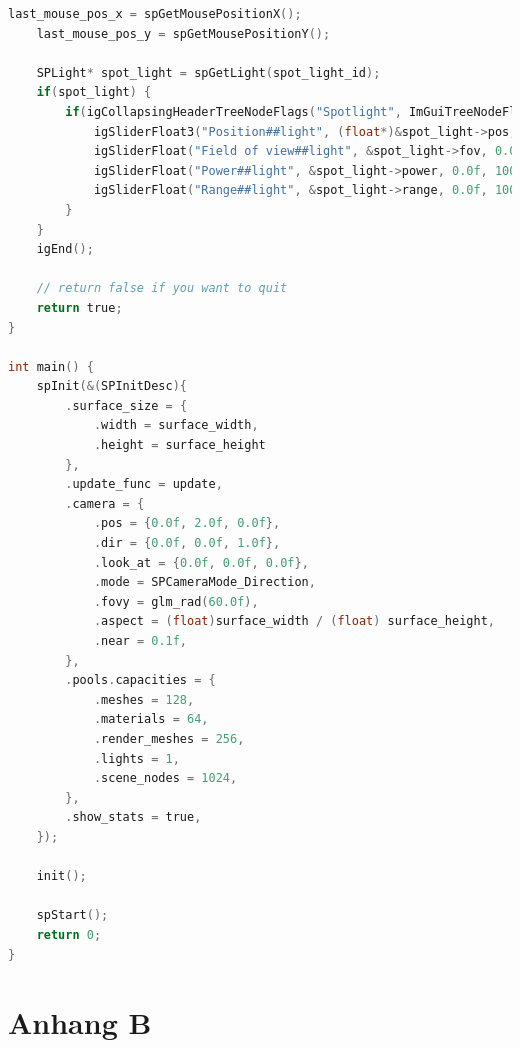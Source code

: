 \documentclass[oneside]{ausarbeitung}
\begin{document}
\begin{lstlisting}[language=C, label={lst:full_example}, caption={Kompletter C99-Quellcode zur Erstellung einer interaktiven 3D-Szene mit der \textbf{spider}-Engine}]
    last_mouse_pos_x = spGetMousePositionX();
    last_mouse_pos_y = spGetMousePositionY();
    
    SPLight* spot_light = spGetLight(spot_light_id);
    if(spot_light) {
        if(igCollapsingHeaderTreeNodeFlags("Spotlight", ImGuiTreeNodeFlags_None)) {
            igSliderFloat3("Position##light", (float*)&spot_light->pos, -50.0f, 50.0f, "%.1f", 1.0f);
            igSliderFloat("Field of view##light", &spot_light->fov, 0.0f, M_PI, "%.2f", 1.0f);
            igSliderFloat("Power##light", &spot_light->power, 0.0f, 1000.0f, "%.0f", 1.0f);
            igSliderFloat("Range##light", &spot_light->range, 0.0f, 1000.0f, "%.0f", 1.0f);
        }
    }
    igEnd();

    // return false if you want to quit
    return true;
}

int main() {
    spInit(&(SPInitDesc){
        .surface_size = {
            .width = surface_width,
            .height = surface_height
        },
        .update_func = update,
        .camera = {
            .pos = {0.0f, 2.0f, 0.0f},
            .dir = {0.0f, 0.0f, 1.0f},
            .look_at = {0.0f, 0.0f, 0.0f},
            .mode = SPCameraMode_Direction,
            .fovy = glm_rad(60.0f),
            .aspect = (float)surface_width / (float) surface_height,
            .near = 0.1f,
        },
        .pools.capacities = {
            .meshes = 128,
            .materials = 64,
            .render_meshes = 256,
            .lights = 1,
            .scene_nodes = 1024,
        },
        .show_stats = true,
    });

    init();

    spStart();
    return 0;
}
\end{lstlisting}

\chapter{Anhang B}
\label{appendix:b}
\end{document}
